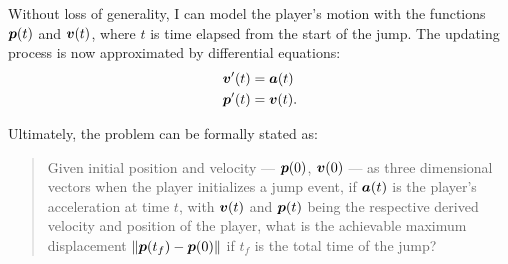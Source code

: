 Without loss of generality, I can model the player's motion with the functions $\boldsymbol{p}(t)$ and $\boldsymbol{v}(t)$, where $t$ is time elapsed from the start of the jump. The updating process is now approximated by differential equations:
\begin{align}
    \boldsymbol{v}'(t) &= \boldsymbol{a}(t) \label{eq:1de1}\\
    \boldsymbol{p}'(t) &= \boldsymbol{v}(t) \label{eq:1de2}.
\end{align}

Ultimately, the problem can be formally stated as:
\begin{quote}
    Given initial position and velocity --- $\boldsymbol{p}(0)$, $\boldsymbol{v}(0)$ --- as three dimensional vectors when the player initializes a jump event, if $\boldsymbol{a}(t)$ is the player's acceleration at time $t$, with $\boldsymbol{v}(t)$ and $\boldsymbol{p}(t)$ being the respective derived velocity and position of the player, what is the achievable maximum displacement $\|\boldsymbol{p}(t_f) - \boldsymbol{p}(0)\|$ if $t_f$ is the total time of the jump?
\end{quote}


